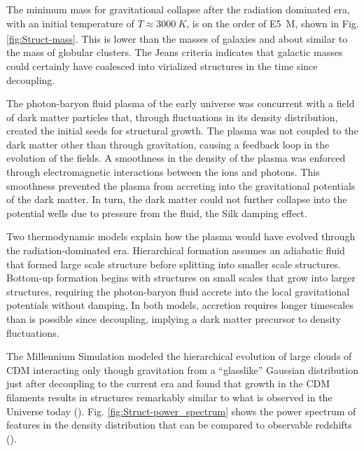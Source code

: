 \documentclass{paper}
\begin{document}
  The minimum mass for gravitational collapse after the radiation dominated
  era, with an initial temperature of \(T \approx \SI{3000}{K}\), is on the 
  order of \SI{E5}{M_{\astrosun}}, shown in Fig. \ref{fig:Struct-mass}.
  This is lower than the masses of galaxies and about 
  similar to the mass of globular clusters.
  The Jeans criteria indicates that galactic masses could certainly have 
  coalesced into virialized structures in the time since decoupling.

  The photon-baryon fluid plasma of the early universe was concurrent with a field of 
  dark matter particles that, through fluctuations in its density 
  distribution, created the initial seeds for structural growth. The plasma 
  was not coupled to the dark matter other than through gravitation, causing
  a feedback loop in the evolution of the fields. A smoothness in the density
  of the plasma was enforced through electromagnetic interactions between the ions and
  photons. 
  This smoothness prevented the plasma from 
  accreting into the gravitational potentials of the dark matter. In turn, the 
  dark matter could not further collapse into the potential wells due 
  to pressure from the fluid, the Silk damping effect.  

  Two thermodynamic models explain how the plasma 
  would have evolved through the radiation-dominated era. Hierarchical
  formation assumes an adiabatic fluid that formed large scale structure 
  before splitting into smaller scale structures. Bottom-up formation
  begins with structures on small scales that grow into larger structures, 
  requiring the photon-baryon fluid 
  accrete into the local gravitational potentials without 
  damping. In both models, accretion requires longer timescales than 
  is possible since decoupling, implying a dark matter precursor to 
  density fluctuations.

  The Millennium Simulation modeled the hierarchical evolution of large clouds 
  of CDM 
  interacting only though gravitation from a ``glasslike'' Gaussian 
  distribution just after decoupling to the current era and found that
  growth in the CDM filaments results in structures remarkably 
  similar to what is observed in the Universe today
  (\cite{desjacques2018large}). Fig. \ref{fig:Struct-power_spectrum} shows the 
  power spectrum of features in the density distribution that can be compared
  to observable redshifts
  (\cite{2005Natur.435..629S}). 
\end{document}

